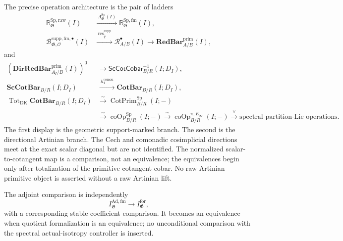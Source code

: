 \begin{theorem}
The precise operation architecture is the pair of ladders
\[
\boxed{
\begin{aligned}
\mathbb B_{\mathfrak G}^{\mathrm{Sp,raw}}(I)
&\xrightarrow{\ \Lambda_{\mathfrak G}^{\mathrm{Sp}}(I)\ }
\mathbb B_{\mathfrak G}^{\mathrm{Sp,fm}}(I),\\[2mm]
\mathscr B^{\mathrm{supp,fm},\bullet}_{\mathfrak G,\mathcal O}(I)
&\xrightarrow{\ \operatorname{res}^{\mathrm{supp}}_{\widetilde q}\ }
\mathscr R_{A/B}^{\bullet}(I)
\longrightarrow
\mathbf{RedBar}^{\mathrm{prim}}_{A/B}(I),
\end{aligned}}
\]
and
\[
\boxed{
\begin{aligned}
\left(\mathbf{DirRedBar}^{\mathrm{prim}}_{A_I/B}(I)\right)^0
&\longrightarrow
\mathsf{ScCotCobar}^{-1}_{B/R}(I;D_I),\\[2mm]
\mathbf{ScCotBar}_{B/R}(I;D_I)
&\xrightarrow{\ h_I^{\mathrm{comon}}\ }
\mathbf{CotBar}_{B/R}(I;D_I),\\[2mm]
\operatorname{Tot}_{\mathrm{DK}}\mathbf{CotBar}_{B/R}(I;D_I)
&\xrightarrow{\sim}
\operatorname{CotPrim}^{\mathrm{Sp}}_{B/R}(I;-)\\
&\xrightarrow{\sim}
\operatorname{coOp}_{B/R}^{\mathrm{Sp}}(I;-)
\xrightarrow{\sim}
\operatorname{coOp}_{B/R}^{\pi,E_\infty}(I;-)
\xrightarrow{\ \vee\ }
\text{spectral partition-Lie operations}.
\end{aligned}}
\]
The first display is the geometric support-marked branch.  The second is the
directional Artinian branch.  The Cech and comonadic cosimplicial directions
meet at the exact scalar diagonal but are not identified.  The normalized
scalar-to-cotangent map is a comparison, not an equivalence; the equivalences
begin only after totalization of the primitive cotangent cobar.  No raw
Artinian primitive object is asserted without a raw Artinian lift.

The adjoint comparison is independently
\[
\boxed{
    I_{\mathfrak G}^{\mathrm{Ad,fm}}
    \longrightarrow
    I_{\mathfrak G}^{\mathrm{for}},
}
\]
with a corresponding stable coefficient comparison.  It becomes an
equivalence when quotient formalization is an equivalence; no unconditional
comparison with the spectral actual-isotropy controller is inserted.
\end{theorem}

